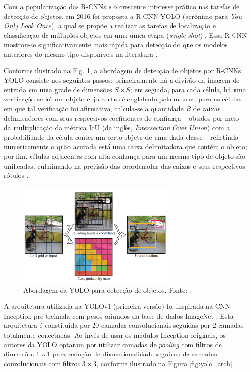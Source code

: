 
Com a popularização das R-CNNs e o crescente interesse prático nas tarefas de detecção de objetos, em 2016 foi proposta a R-CNN YOLO (acrônimo para \emph{You Only Look Once}), a qual se propõe a realizar as tarefas de localização e classificação de múltiplos objetos em uma única etapa (\emph{single-shot}) \cite{Redmon:YOLOoriginal}. Essa R-CNN mostrou-se significativamente mais rápida para detecção do que os modelos anteriores do mesmo tipo disponíveis na literatura \cite{Michelucci:2019}.

Conforme ilustrado na Fig. \ref{fig:yolo_grid}, a abordagem de detecção de objetos por R-CNNs YOLO consiste nos seguintes passos: primeiramente há a divisão da imagem de entrada em uma grade de dimensões $S \times S$; em seguida, para cada célula, há uma verificação se há um objeto cujo centro é englobado pela mesma; para as células em que tal verificação foi afirmativa, calcula-se a quantidade $B$ de caixas delimitadores com seus respectivos coeficientes de confiança -- obtidos por meio da multiplicação da métrica IoU (do inglês, \emph{Intersection Over Union}) com a probabilidade da célula conter um certo objeto de uma dada classe -- refletindo numericamente o quão acurada está uma caixa delimitadora que contém o objeto; por fim, células adjacentes com alta confiança para um mesmo tipo de objeto são unificadas, culminando na previsão das coordenadas das caixas e seus respectivos rótulos \cite{Michelucci:2019}.

\begin{figure}[H]
    \centering
    \includegraphics[width=0.70\textwidth]{img/yolo-approach}
    \caption{Abordagem da YOLO para detecção de objetos.
    Fonte: \cite{Redmon:YOLOoriginal}.}
    \label{fig:yolo_grid}
\end{figure}

A arquitetura utilizada na YOLOv1 (primeira versão) foi inspirada na CNN Inception pré-treinada com pesos oriundos da base de dados ImageNet \cite{ImageNet}. Esta arquitetura é constituída por $20$ camadas convolucionais seguidas por $2$ camadas totalmente conectadas. Ao invés de usar os módulos Inception originais, os autores da YOLO optaram por utilizar camadas de \emph{pooling} com filtros de dimensões $1\times 1$ para redução de dimensionalidade seguidos de camadas convolucionais com filtros $3 \times 3$, conforme ilustrado na Figura \ref{fig:yolo_arch}.

